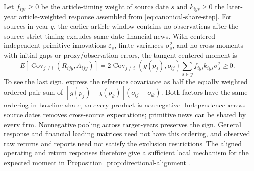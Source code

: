 Let $f_{iys}\geq0$ be the article-timing weight of source date $s$ and
$k_{iys}\geq0$ the later-year article-weighted response assembled from
\eqref{eq:canonical-share-step}.
For sources in year $y$, the earlier article window contains no observations
after the source; strict timing excludes same-date financial news.
With centered independent primitive innovations $\varepsilon_s$, finite
variances $\sigma_s^2$, and no cross moments with initial gaps or
proxy/observation errors, the tangent centered moment is
\begin{equation}\label{eq:canonical-directional-moment}
  E[\operatorname{Cov}_{j\ne i}(R_{ijy},A_{ijy})]
  =2\operatorname{Cov}_{j\ne i}(g(p_j),o_{ij})
  \sum_{s\in y}f_{iys}k_{iys}\sigma_s^2\geq0.
\end{equation}
To see the last sign, express the reference covariance as half the equally
weighted ordered pair sum of
$[g(p_j)-g(p_k)](o_{ij}-o_{ik})$.
Both factors have the same ordering in baseline share, so every product is nonnegative.
Independence across source dates removes cross-source expectations; primitive
news can be shared by every firm.
Nonnegative pooling across target-years preserves the sign.
General response and financial loading matrices need not have this ordering,
and observed raw returns and reports need not satisfy the exclusion restrictions.
The aligned operating and return responses therefore give a sufficient
local mechanism for the expected moment in
Proposition~\ref{prop:directional-alignment}.
